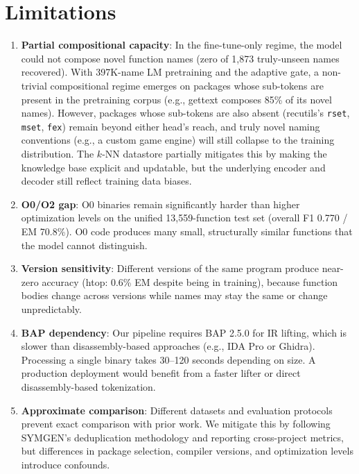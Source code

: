 \documentclass[sigconf,nonacm]{acmart}
\begin{document}
\section{Limitations}
\label{sec:limitations}

\begin{enumerate}
    \item \textbf{Partial compositional capacity}: In the fine-tune-only regime, the model could not compose novel function names (zero of 1{,}873 truly-unseen names recovered). With 397K-name LM pretraining and the adaptive gate, a non-trivial compositional regime emerges on packages whose sub-tokens are present in the pretraining corpus (e.g., gettext composes 85\% of its novel names). However, packages whose sub-tokens are also absent (recutils's \texttt{rset}, \texttt{mset}, \texttt{fex}) remain beyond either head's reach, and truly novel naming conventions (e.g., a custom game engine) will still collapse to the training distribution. The $k$-NN datastore partially mitigates this by making the knowledge base explicit and updatable, but the underlying encoder and decoder still reflect training data biases.

    \item \textbf{O0/O2 gap}: O0 binaries remain significantly harder than higher optimization levels on the unified 13,559-function test set (overall F1 0.770 / EM 70.8\%). O0 code produces many small, structurally similar functions that the model cannot distinguish.

    \item \textbf{Version sensitivity}: Different versions of the same program produce near-zero accuracy (htop: 0.6\% EM despite being in training), because function bodies change across versions while names may stay the same or change unpredictably.

    \item \textbf{BAP dependency}: Our pipeline requires BAP 2.5.0 for IR lifting, which is slower than disassembly-based approaches (e.g., IDA Pro or Ghidra). Processing a single binary takes 30--120 seconds depending on size. A production deployment would benefit from a faster lifter or direct disassembly-based tokenization.

    \item \textbf{Approximate comparison}: Different datasets and evaluation protocols prevent exact comparison with prior work. We mitigate this by following SYMGEN's deduplication methodology and reporting cross-project metrics, but differences in package selection, compiler versions, and optimization levels introduce confounds.


\end{enumerate}
\end{document}
